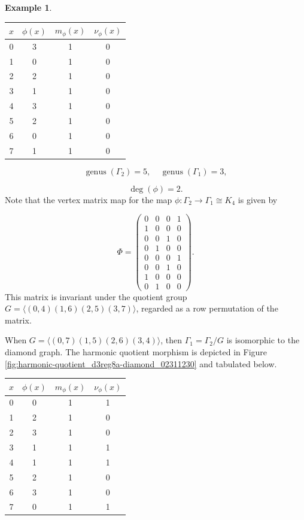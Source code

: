 \documentclass[12pt,letterpaper]{article}
\theoremstyle{definition}
\newtheorem{example}[theorem]{Example}
\DeclareMathOperator{\genus}{genus}
\begin{document}
\begin{example}
{\begin{center}
\begin{tabular}{c|c|c|c}  
  $x$ & $\phi(x)$ & $m_\phi(x)$ & $\nu_\phi(x)$ \\ \hline
  0   &    3   &        1         &  0   \\ 
  1   &    0   &        1         &  0   \\ 
  2   &    2    &       1         &  0   \\ 
  3   &    1   &        1         &  0   \\ 
  4   &    3   &        1         &  0   \\ 
  5   &    2   &        1         &  0    \\ 
  6   &    0   &        1         &  0   \\ 
  7   &    1   &        1         &  0   \\ 
\end{tabular}
\end{center}
  
\[
  \genus(\Gamma_2) =5,\ \ \ \ \
  \genus(\Gamma_1) =3,
\]

\[
\deg(\phi) =2.
\]
Note that the vertex matrix map for the map $\phi:\Gamma_2\to \Gamma_1\cong K_4$ is given by

\[
\Phi =
\left(\begin{array}{rrrr}
0 & 0 & 0 & 1 \\
1 & 0 & 0 & 0 \\
0 & 0 & 1 & 0 \\
0 & 1 & 0 & 0 \\
0 & 0 & 0 & 1 \\
0 & 0 & 1 & 0 \\
1 & 0 & 0 & 0 \\
0 & 1 & 0 & 0
\end{array}\right).
\]
This matrix is invariant under the quotient group
$G = \langle (0,4)(1,6)(2,5)(3,7)\rangle$, regarded as
a row permutation of the matrix.

When $G=\langle (0,7)(1,5)(2,6)(3,4) \rangle$, then
$\Gamma_1=\Gamma_2/G$ is isomorphic to the diamond graph.
The harmonic quotient morphism is depicted in
Figure \ref{fig:harmonic-quotient_d3reg8a-diamond_02311230}
and tabulated below.

\begin{center}
\begin{tabular}{c|c|c|c}  
  $x$ & $\phi(x)$ & $m_\phi(x)$ & $\nu_\phi(x)$ \\ \hline
  0   &    0   &        1         &  1   \\ 
  1   &    2   &        1         &  0   \\ 
  2   &    3    &       1         &  0   \\ 
  3   &    1   &        1         &  1   \\ 
  4   &    1   &        1         &  1   \\ 
  5   &    2   &        1         &  0    \\ 
  6   &    3   &        1         &  0   \\ 
  7   &    0   &        1         &  1   \\ 
\end{tabular}
\end{center}

}
\end{example}
\end{document}
